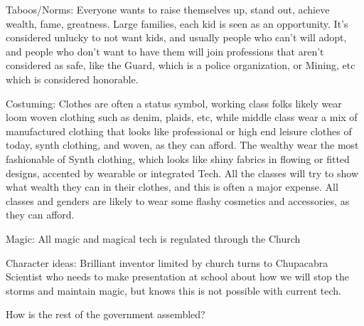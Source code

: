 \documentclass[blue]{GL2020}
\begin{document}
Taboos/Norms:		Everyone wants to raise themselves up, stand out, achieve wealth, fame, greatness.  Large families, each kid is seen as an opportunity.  It's considered unlucky to not want kids, and usually people who can't will adopt, and people who don't want to have them will join professions that aren't considered as safe, like the Guard, which is a police organization, or Mining, etc which is considered honorable.

Costuming:		Clothes are often a status symbol, working class folks likely wear loom woven clothing such as denim, plaids, etc, while middle class wear a mix of manufactured clothing that looks like professional or high end leisure clothes of today, synth clothing, and woven, as they can afford.  The wealthy wear the most fashionable of Synth clothing, which looks like shiny fabrics in flowing or fitted designs, accented by wearable or integrated Tech.  All the classes will try to show what wealth they can in their clothes, and this is often a major expense.  All classes and genders are likely to wear some flashy cosmetics and accessories, as they can afford.

Magic:	All magic and magical tech is regulated through the Church

Character ideas:  Brilliant inventor limited by church turns to Chupacabra
									Scientist who needs to make presentation at school about how we will stop the storms and
										maintain magic, but knows this is not possible with current tech.
									







 How is the rest of the government assembled?
\end{document}
